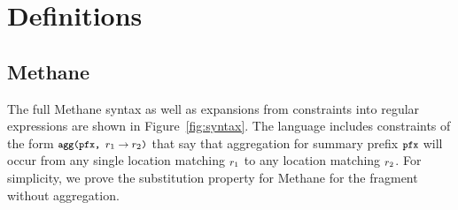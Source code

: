 \documentclass[twocolumn, openany]{sig-alternate-10pt}
\newcommand{\sysname}{{\small \sf Methane}\xspace}
\newcommand{\CD}[1]{\texttt{\small #1}}  %
\newcommand{\KW}[1]{\texttt{\small\bfseries{#1}}}
\newcommand{\Agg}{\KW{agg}}
\begin{document}
\setlength{\pdfpageheight}{\paperheight}
\setlength{\pdfpagewidth}{\paperwidth}

\onecolumn

\appendix

\section{Definitions}

\subsection{Methane}

The full \sysname syntax as well as expansions from constraints into regular expressions are shown in Figure~\ref{fig:syntax}. The language includes constraints of the form $\CD{\Agg(pfx, \ensuremath{r_1 \rightarrow r_2})}$ that say that aggregation for summary prefix $\CD{pfx}$ will occur from any single location matching $\CD{\ensuremath{r_1}}$ to any location matching $\CD{\ensuremath{r_2}}$. For simplicity, we prove the substitution property for \sysname for the fragment without aggregation.
\end{document}
